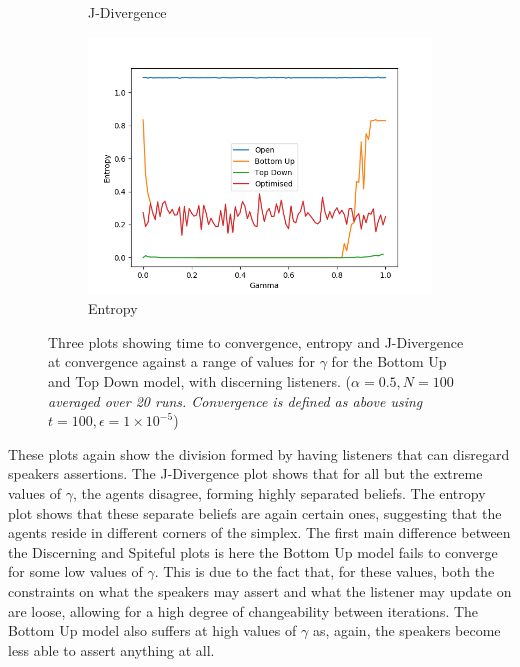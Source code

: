 \begin{figure}[H]
\begin{subfigure}[ht]{0.45\textwidth}
    \caption{J-Divergence}
 \end{subfigure}
 \hfill
 \begin{subfigure}[ht]{0.45\textwidth}
    \includegraphics[width=\textwidth]{Images/Figures/ListenerModelPlots/Spiteful/Entropy.png}
    \caption{Entropy}
 \end{subfigure}
 \caption{Three plots showing time to convergence, entropy and J-Divergence at convergence against a range of values for $\gamma$ for the Bottom Up and Top Down model, with discerning listeners. (\textit{$\alpha = 0.5, N = 100$ averaged over 20 runs. Convergence is defined as above using $t=100, \epsilon = 1\times10^{-5}$})}\label{fig:convergence_Spite}
\end{figure}

These plots again show the division formed by having listeners that can disregard speakers assertions. The J-Divergence plot shows that for all but the extreme values of $\gamma$, the agents disagree, forming highly separated beliefs. The entropy plot shows that these separate beliefs are again certain ones, suggesting that the agents reside in different corners of the simplex. The first main difference between the Discerning and Spiteful plots is here the Bottom Up model fails to converge for some low values of $\gamma$. This is due to the fact that, for these values, both the constraints on what the speakers may assert and what the listener may update on are loose, allowing for a high degree of changeability between iterations. The Bottom Up model also suffers at high values of $\gamma$ as, again, the speakers become less able to assert anything at all. 




